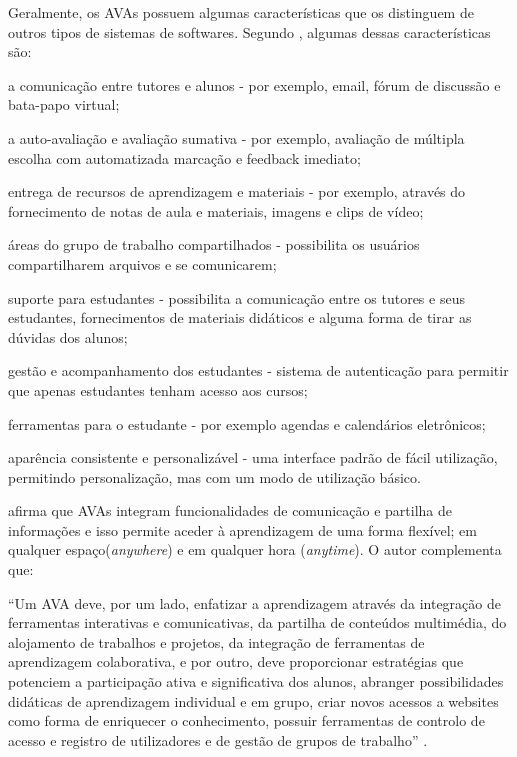 Geralmente, os AVAs possuem algumas características que os distinguem de outros tipos de sistemas de softwares. Segundo , algumas dessas características são:
\begin{alineascomponto}
    \item a comunicação entre tutores e alunos - por exemplo, email, fórum de discussão e bata-papo virtual;
    \item a auto-avaliação e avaliação sumativa - por exemplo, avaliação de múltipla escolha com automatizada marcação e feedback imediato; 
    \item entrega de recursos de aprendizagem e materiais - por exemplo, através do fornecimento de notas de aula e materiais, imagens e clips de vídeo;
    \item áreas do grupo de trabalho compartilhados - possibilita os usuários compartilharem arquivos e se comunicarem;
    \item suporte para estudantes - possibilita a comunicação entre os tutores e seus estudantes, fornecimentos de materiais didáticos e alguma forma de tirar as dúvidas dos alunos;
    \item gestão e acompanhamento dos estudantes - sistema de autenticação para permitir que apenas estudantes tenham acesso aos cursos;
    \item ferramentas para o estudante - por exemplo agendas e calendários eletrônicos;
    \item aparência consistente e personalizável - uma interface padrão de fácil utilização, permitindo personalização, mas com um modo de utilização básico.
\end{alineascomponto}

 afirma que AVAs integram funcionalidades de comunicação e partilha de informações e isso 
permite aceder à aprendizagem de uma forma flexível; em qualquer espaço(\textit{anywhere}) e em qualquer hora (\textit{anytime}). 
O autor complementa que:

\begin{citacao}
``Um AVA deve, por um lado, enfatizar a aprendizagem através da integração de ferramentas interativas e comunicativas, da 
partilha de conteúdos multimédia, do alojamento de trabalhos e projetos, da integração de ferramentas de aprendizagem colaborativa, 
e por outro, deve proporcionar estratégias que potenciem a participação ativa e significativa dos alunos, abranger possibilidades 
didáticas de aprendizagem individual e em grupo, criar novos acessos a websites como forma de enriquecer o conhecimento, possuir 
ferramentas de controlo de acesso e registro de utilizadores e de gestão de grupos de trabalho'' \cite[p.~41]{carvalho2013ambiente}. 
\end{citacao}

